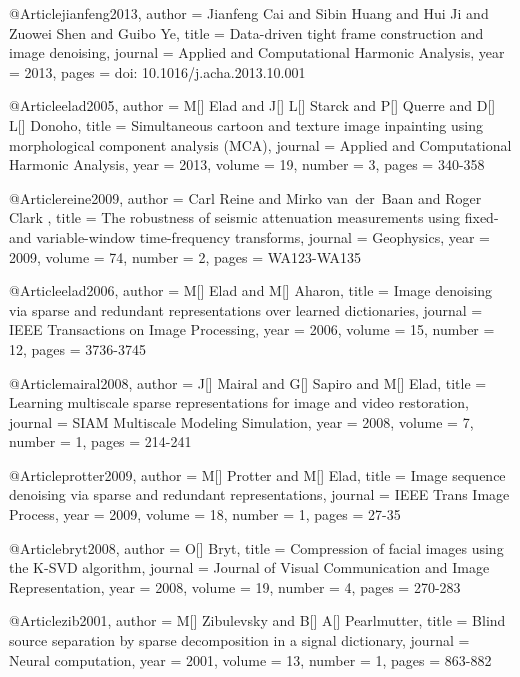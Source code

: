 {@Article{jianfeng2013,
  author = 	 {Jianfeng Cai and Sibin Huang and Hui Ji and Zuowei Shen and Guibo Ye},
  title = 	 {Data-driven tight frame construction and image denoising},
  journal = 	 {Applied and Computational Harmonic Analysis},
  year = 	 2013,
  pages = 	 {doi: 10.1016/j.acha.2013.10.001}}


@Article{elad2005,
  author = 	 {M[] Elad and J[] L[] Starck and P[] Querre and D[] L[] Donoho},
  title = 	 {Simultaneous cartoon and texture image inpainting using morphological component analysis (MCA)},
  journal = 	 {Applied and Computational Harmonic Analysis},
  year = 	 2013,
  volume = 	 19,
  number = 	 3,
  pages = 	 {340-358}}

@Article{reine2009,
  author = 	 {Carl Reine and Mirko van~der~Baan and Roger Clark },
  title = 	 {The robustness of seismic attenuation measurements using fixed- and variable-window time-frequency transforms},
  journal = 	 {Geophysics},
  year = 	 2009,
  volume = 	 74,
  number = 	 2,
  pages = 	 {WA123-WA135}}



@Article{elad2006,
  author = 	 {M[] Elad and M[] Aharon},
  title = 	 {Image denoising via sparse and redundant representations over learned dictionaries},
  journal = 	 {IEEE Transactions on Image Processing},
  year = 	 2006,
  volume = 	 15,
  number = 	 12,
  pages = 	 {3736-3745}}

@Article{mairal2008,
  author = 	 {J[] Mairal and G[] Sapiro and M[] Elad},
  title = 	 {Learning multiscale sparse representations for image and video restoration},
  journal = 	 {SIAM Multiscale Modeling Simulation},
  year = 	 2008,
  volume = 	 7,
  number = 	 1,
  pages = 	 {214-241}}


@Article{protter2009,
  author = 	 {M[] Protter and M[] Elad},
  title = 	 {Image sequence denoising via sparse and redundant representations},
  journal = 	 {IEEE Trans Image Process},
  year = 	 2009,
  volume = 	 18,
  number = 	 1,
  pages = 	 {27-35}}

@Article{bryt2008,
  author = 	 {O[] Bryt},
  title = 	 {Compression of facial images using the {K}-{SVD} algorithm},
  journal = 	 {Journal of Visual Communication and Image Representation},
  year = 	 2008,
  volume = 	 19,
  number = 	 4,
  pages = 	 {270-283}}

@Article{zib2001,
  author = 	 {M[] Zibulevsky and B[] A[] Pearlmutter},
  title = 	 {Blind source separation by sparse decomposition in a signal dictionary},
  journal = 	 {Neural computation},
  year = 	 2001,
  volume = 	 13,
  number = 	 1,
  pages = 	 {863-882}}

}
